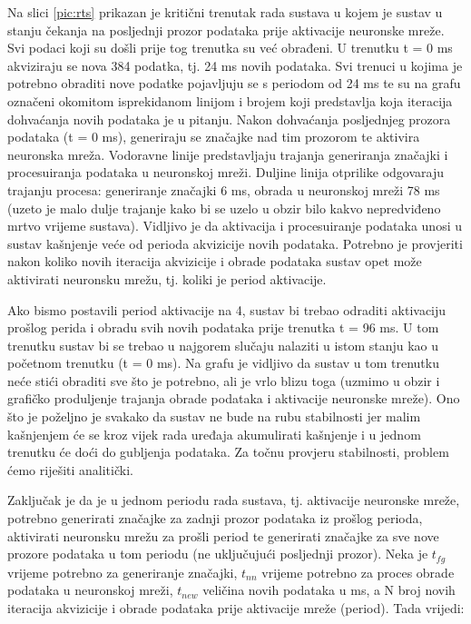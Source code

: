 Na slici \ref{pic:rts} prikazan je kritični trenutak rada sustava u kojem je sustav 
u stanju čekanja na posljednji prozor podataka prije aktivacije neuronske mreže. Svi
podaci koji su došli prije tog trenutka su već obrađeni. U trenutku t = 0 ms akviziraju se
nova 384 podatka, tj. 24 ms novih podataka. Svi trenuci u kojima je potrebno obraditi nove podatke
pojavljuju se s periodom od 24 ms te su na grafu označeni okomitom isprekidanom linijom i brojem
koji predstavlja koja iteracija dohvaćanja novih podataka je u pitanju. Nakon dohvaćanja
posljednjeg prozora podataka (t = 0 ms), generiraju se značajke nad tim prozorom te aktivira neuronska mreža.
Vodoravne linije predstavljaju trajanja
generiranja značajki i procesuiranja podataka u neuronskoj mreži. Duljine linija otprilike
odgovaraju trajanju procesa: generiranje značajki 6 ms, obrada u neuronskoj mreži 78 ms 
(uzeto je malo dulje trajanje kako bi se uzelo u obzir bilo kakvo nepredviđeno mrtvo vrijeme sustava).
Vidljivo je da aktivacija i procesuiranje podataka unosi u sustav kašnjenje veće od perioda
akvizicije novih podataka. Potrebno je provjeriti nakon koliko novih iteracija akvizicije i obrade
podataka sustav opet može aktivirati neuronsku mrežu, tj. koliki je period aktivacije.

Ako bismo postavili period aktivacije na 4, sustav bi trebao odraditi aktivaciju prošlog
perida i obradu svih novih podataka prije trenutka t = 96 ms. U tom trenutku sustav bi se trebao
u najgorem slučaju nalaziti u istom stanju kao u početnom trenutku (t = 0 ms). Na grafu
je vidljivo da sustav u tom trenutku neće stići obraditi sve što je potrebno, ali je vrlo blizu
toga (uzmimo u obzir i grafičko produljenje trajanja obrade podataka i aktivacije neuronske mreže). 
Ono što je poželjno je svakako da sustav ne bude na rubu stabilnosti jer malim kašnjenjem će se
kroz vijek rada uređaja akumulirati kašnjenje i u jednom trenutku će doći do gubljenja podataka.
Za točnu provjeru stabilnosti, problem ćemo riješiti analitički.

Zaključak je da je u jednom periodu rada sustava, tj. aktivacije neuronske mreže, potrebno
generirati značajke za zadnji prozor podataka iz prošlog perioda, aktivirati neuronsku mrežu
za prošli period te generirati značajke za sve nove prozore podataka u tom periodu (ne uključujući
posljednji prozor).
Neka je $t_{fg}$ vrijeme potrebno za generiranje
značajki, $t_{nn}$ vrijeme potrebno za proces obrade podataka u neuronskoj mreži,
$t_{new}$ veličina novih podataka u ms, a N broj novih iteracija akvizicije i obrade podataka
prije aktivacije mreže (period). Tada vrijedi:

